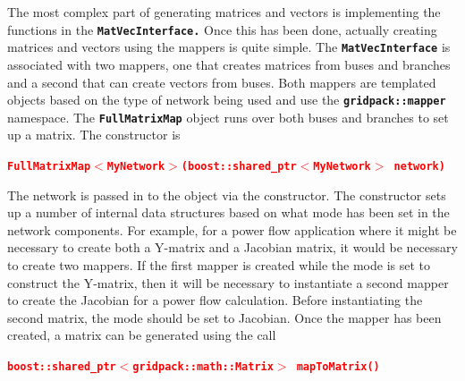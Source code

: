 \documentclass[12pt]{report} %
\begin{document}





The most complex part of generating matrices and vectors is implementing the functions in the \texttt{\textbf{MatVecInterface.}} Once this has been done, actually creating matrices and vectors using the mappers is quite simple. The \texttt{\textbf{MatVecInterface}} is associated with two mappers, one that creates matrices from buses and branches and a second that can create vectors from buses. Both mappers are templated objects based on the type of network being used and use the \texttt{\textbf{gridpack::mapper}} namespace. The \texttt{\textbf{FullMatrixMap}} object runs over both buses and branches to set up a matrix. The constructor is

\textcolor{red}{\texttt{\textbf{FullMatrixMap$\boldsymbol{\mathrm{<}}$MyNetwork$\boldsymbol{\mathrm{>}}$(boost::shared\_ptr$\boldsymbol{\mathrm{<}}$MyNetwork$\boldsymbol{\mathrm{>}}$ network)}}}

The network is passed in to the object via the constructor. The constructor sets up a number of internal data structures based on what mode has been set in the network components. For example, for a power flow application where it might be necessary to create both a Y-matrix and a Jacobian matrix, it would be necessary to create two mappers. If the first mapper is created while the mode is set to construct the Y-matrix, then it will be necessary to instantiate a second mapper to create the Jacobian for a power flow calculation. Before instantiating the second matrix, the mode should be set to Jacobian.
Once the mapper has been created, a matrix can be generated using the call

\textcolor{red}{\texttt{\textbf{boost::shared\_ptr$\boldsymbol{\mathrm{<}}$gridpack::math::Matrix$\boldsymbol{\mathrm{>}}$ mapToMatrix()}}}
\end{document}
